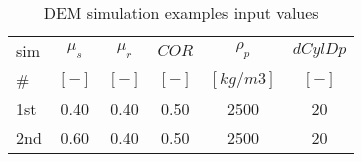 \begin{table}[h]
\centering
\begin{tabular}{lccccc}
\hline
 sim &  $\mu_s$ & $\mu_r$ & $COR$ & $\rho_p$ & $dCylDp$ \\
  \#  &	$[-]$  & $[-]$   & $[-]$   & $[kg/m3]$ & $[-]$ \\
          \hline
    1st & 0.40  & 0.40  & 0.50  & 2500  & 20 \\
    2nd & 0.60  & 0.40  & 0.50  & 2500  & 20 \\


\hline
\end{tabular}
\caption{DEM simulation examples input values}
\label{tab:11DEMSimExampleinputvalues}
\end{table}